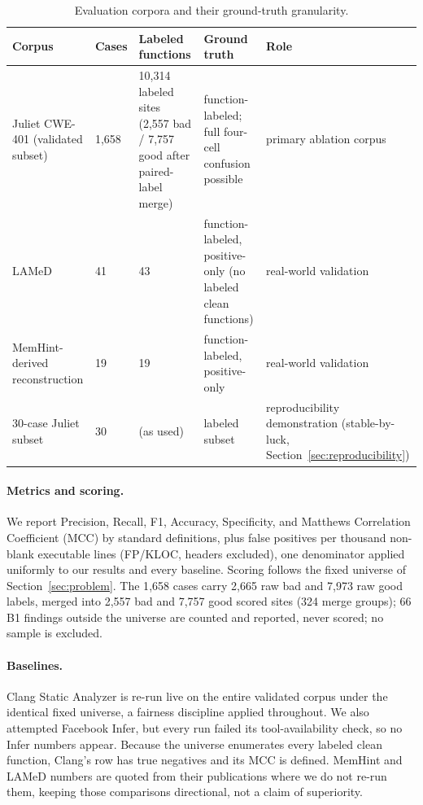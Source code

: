 \documentclass[a4paper]{llncs}
\begin{document}
\begin{table}[htbp]
\centering
\caption{Evaluation corpora and their ground-truth granularity.}
\label{tab:corpora}
\footnotesize
\begin{tabular}{@{}p{2.7cm}p{0.9cm}p{1.9cm}p{3.0cm}p{2.0cm}@{}}
\toprule
Corpus & Cases & Labeled functions & Ground truth & Role \\
\midrule
Juliet CWE-401 (validated subset) & 1{,}658 & 10{,}314 labeled sites (2{,}557 bad / 7{,}757 good after paired-label merge) & function-labeled; full four-cell confusion possible & primary ablation corpus \\
LAMeD & 41 & 43 & function-labeled, positive-only (no labeled clean functions) & real-world validation \\
MemHint-derived reconstruction & 19 & 19 & function-labeled, positive-only & real-world validation \\
30-case Juliet subset & 30 & (as used) & labeled subset & reproducibility demonstration (stable-by-luck, Section~\ref{sec:reproducibility}) \\
\bottomrule
\end{tabular}
\end{table}

\paragraph{Metrics and scoring.} We report Precision, Recall, F1,
Accuracy, Specificity, and Matthews Correlation Coefficient (MCC) by
standard definitions, plus false
positives per thousand non-blank executable lines (FP/KLOC, headers
excluded), one denominator applied uniformly to our results and every
baseline. Scoring follows the fixed universe of
Section~\ref{sec:problem}. The 1{,}658 cases carry 2{,}665 raw bad and
7{,}973 raw good labels, merged into 2{,}557 bad and 7{,}757 good
scored sites (324 merge groups); 66 B1 findings outside the universe
are counted and reported, never scored; no sample is excluded.

\paragraph{Baselines.} Clang Static Analyzer is re-run live on the
entire validated corpus under the identical fixed universe, a fairness
discipline
applied throughout. We also attempted Facebook Infer, but every run
failed its tool-availability check, so no Infer numbers appear. Because
the universe enumerates every labeled clean function, Clang's row has
true negatives and its MCC is defined. MemHint and LAMeD numbers are
quoted from their publications where we do not re-run them, keeping
those comparisons directional,
not a claim of superiority.
\end{document}

